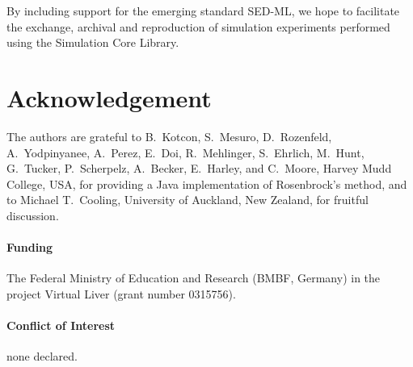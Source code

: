 \documentclass{bioinfo}
\begin{document}

By including support for the emerging standard SED-ML, we hope to facilitate the
exchange, archival and reproduction of simulation experiments performed using
the Simulation Core Library.

\section*{Acknowledgement}

The authors are grateful to B.~Kotcon, S.~Mesuro, D.~Rozenfeld, A.~Yodpinyanee,
A.~Perez, E.~Doi, R.~Mehlinger, S.~Ehrlich, M.~Hunt, G.~Tucker, P.~Scherpelz,
A.~Becker, E.~Harley, and C.~Moore, Harvey Mudd College, USA, for providing a
Java implementation of Rosenbrock's method, and to Michael T.~Cooling,
University of Auckland, New Zealand, for fruitful discussion.

\paragraph{Funding\textcolon} 
The Federal Ministry of Education and Research (BMBF, Germany) in the project
Virtual Liver (grant number 0315756).

\paragraph{Conflict of Interest\textcolon} none declared.
\vspace{-.25cm}
\end{document}
